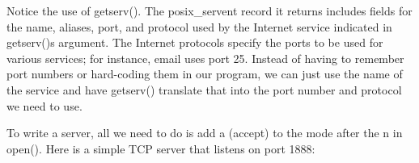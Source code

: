 
Notice the use of \textsf{getserv()}. The
\textsf{posix\_servent} record it returns includes fields for the name,
aliases, port, and protocol used by the Internet service indicated in
\textsf{getserv()}{\textquotesingle}s argument. The Internet protocols
specify the ports to be used for various services; for instance, email
uses port 25. Instead of having to remember port numbers or hard-coding
them in our program, we can just use the name of the service and have
\textsf{getserv()} translate that into the port number and protocol we
need to use.

To write a server, all we need to do is add
\textsf{{\textquotedbl}a{\textquotedbl}} (accept) to the mode after the
\textsf{{\textquotedbl}n{\textquotedbl}} in \textsf{open()}. Here is a
simple TCP server that listens on port 1888:


